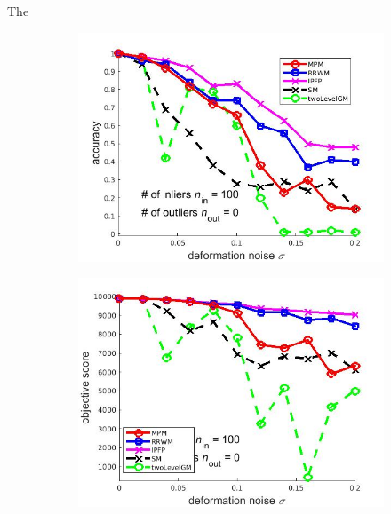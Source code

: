 \documentclass[
	fontsize=12pt,
	paper=a4,
	twoside=false,
	numbers=noenddot,
	plainheadsepline,
	toc=listof,
	toc=bibliography
]{scrartcl}
\begin{document}
The 

\begin{figure}[ht] 
	\begin{subfigure}[b]{0.3\textwidth}
		\centering
		\includegraphics[scale=0.25]{"fig_ver2008/syntheticPointSets/deformation_test/accuracy_greedy"} 
	\end{subfigure}%
	\begin{subfigure}[b]{0.3\textwidth}
		\centering
		\includegraphics[scale=0.25]{"fig_ver2008/syntheticPointSets/deformation_test/score_greedy"} 
	\end{subfigure} 
	\begin{subfigure}[b]{0.3\textwidth}
		\centering

\end{subfigure}
\end{figure}
\end{document}
